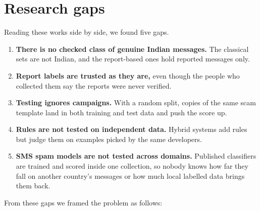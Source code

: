 \section{Research gaps}
Reading these works side by side, we found five gaps.
\begin{enumerate}
\item \textbf{There is no checked class of genuine Indian messages.} The classical sets are not Indian, and the report-based ones hold reported messages only.
\item \textbf{Report labels are trusted as they are,} even though the people who collected them say the reports were never verified.
\item \textbf{Testing ignores campaigns.} With a random split, copies of the same scam template land in both training and test data and push the score up.
\item \textbf{Rules are not tested on independent data.} Hybrid systems add rules but judge them on examples picked by the same developers.
\item \textbf{SMS spam models are not tested across domains.} Published classifiers are trained and scored inside one collection, so nobody knows how far they fall on another country's messages or how much local labelled data brings them back.
\end{enumerate}

From these gaps we framed the problem as follows:
\begin{center}
\end{center}

